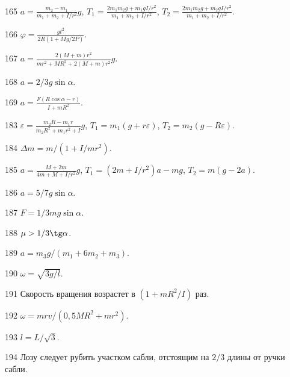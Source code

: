 \begin{Answer}{165}
$a= \frac{m_2-m_1}{m_1+m_2+I/r^2}g$, $T_1 = \frac{2m_1m_2g + m_1gI/r^2}{m_1+m_2+I/r^2}$, $T_2 = \frac{2m_1m_2g + m_2gI/r^2}{m_1+m_2+I/r^2}$.
\end{Answer}
\begin{Answer}{166}
$\varphi = \frac{gt^2}{2R(1+Mg/2P)}$.
\end{Answer}
\begin{Answer}{167}
$a = \frac{2(M+m)r^2}{mr^2+MR^2+2(M+m)r^2}g$.
\end{Answer}
\begin{Answer}{168}
$a=2/3g\sin \alpha$.
\end{Answer}
\begin{Answer}{169}
$a = \frac{F(R\cos \alpha - r)}{I + mR^2}$.
\end{Answer}
\begin{Answer}{183}
$\varepsilon = \frac{m_2R - m_1r}{m_2R^2 + m_1r^2 + I}g$, $T_1 = m_1(g+r\varepsilon)$, $T_2 = m_2(g-R\varepsilon)$.
\end{Answer}
\begin{Answer}{184}
$\Delta m = m/(1+I/mr^2)$.
\end{Answer}
\begin{Answer}{185}
$a = \frac{M+2m}{4m+M+I/r^2}g$, $T_1 = (2m+I/r^2)a - mg$, $T_2=m(g-2a)$.
\end{Answer}
\begin{Answer}{186}
$a=5/7g\sin \alpha$.
\end{Answer}
\begin{Answer}{187}
$F = 1/3 mg \sin \alpha$.
\end{Answer}
\begin{Answer}{188}
$\mu > 1/3 \tg \alpha$.
\end{Answer}
\begin{Answer}{189}
$a = m_3g/(m_1 + 6m_2 +m_3)$.
\end{Answer}
\begin{Answer}{190}
$\omega = \sqrt{3g/l}$.
\end{Answer}
\begin{Answer}{191}
Скорость вращения возрастет в $(1+mR^2/I)$ раз.
\end{Answer}
\begin{Answer}{192}
$\omega = mrv/(0,5MR^2 + mr^2)$.
\end{Answer}
\begin{Answer}{193}
$l = L/\sqrt{3}$.
\end{Answer}
\begin{Answer}{194}
Лозу следует рубить участком сабли, отстоящим на $2/3$ длины от ручки сабли.
\end{Answer}
